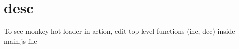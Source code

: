 \chapter{desc}
\hypertarget{md__d_1_2_g_i_t_2_food_link_2foodlink_8client_2node__modules_2bs-recipes_2recipes_2webpack_8monkey-hot-loader_2desc}{}\label{md__d_1_2_g_i_t_2_food_link_2foodlink_8client_2node__modules_2bs-recipes_2recipes_2webpack_8monkey-hot-loader_2desc}
To see {\ttfamily monkey-\/hot-\/loader} in action, edit top-\/level functions ({\ttfamily inc}, {\ttfamily dec}) inside {\ttfamily main.\+js} file 
